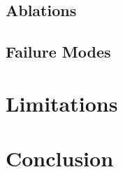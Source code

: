 \documentclass[10pt]{article}
\begin{document}
\subsection{Ablations}

\subsection{Failure Modes}

\section{Limitations}

\section{Conclusion}



\end{document}

